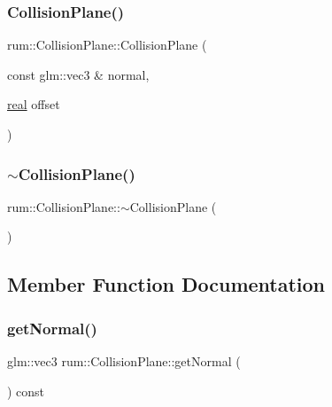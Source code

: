 \subsubsection{\texorpdfstring{Collision\+Plane()}{CollisionPlane()}}
{\footnotesize\ttfamily rum\+::\+Collision\+Plane\+::\+Collision\+Plane (\begin{DoxyParamCaption}\item[{const glm\+::vec3 \&}]{normal,  }\item[{\mbox{\hyperlink{namespacerum_a7e8cca23573d5eaead0f138cbaa4862c}{real}}}]{offset }\end{DoxyParamCaption})}

\mbox{\label{classrum_1_1_collision_plane_aed3fc45bbe236d0e3674745ed511ea14}} 
\subsubsection{\texorpdfstring{$\sim$\+Collision\+Plane()}{~CollisionPlane()}}
{\footnotesize\ttfamily rum\+::\+Collision\+Plane\+::$\sim$\+Collision\+Plane (\begin{DoxyParamCaption}{ }\end{DoxyParamCaption})\hspace{0.3cm}{\ttfamily [default]}}



\subsection{Member Function Documentation}
\mbox{\label{classrum_1_1_collision_plane_a699fae9d74e6e19c4e30870d538c3a71}} 
\subsubsection{\texorpdfstring{get\+Normal()}{getNormal()}}
{\footnotesize\ttfamily glm\+::vec3 rum\+::\+Collision\+Plane\+::get\+Normal (\begin{DoxyParamCaption}{ }\end{DoxyParamCaption}) const}

